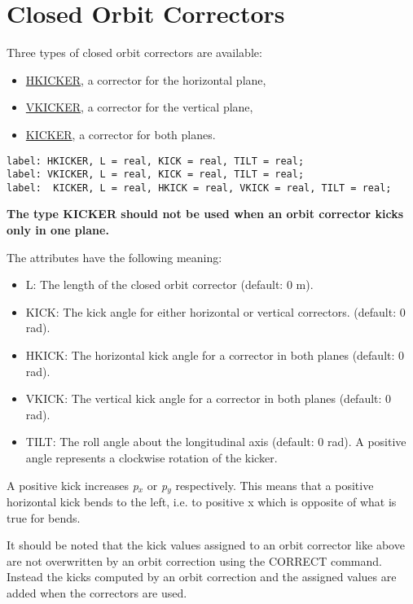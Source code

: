 
\section{Closed Orbit Correctors}
  
Three types of closed orbit correctors are available: 
\begin{itemize}
   \item \href{hkick}{HKICKER}, a corrector for the horizontal plane, 
   \item \href{vkick}{VKICKER}, a corrector for the vertical plane, 
   \item \href{kick}{KICKER}, a corrector for both planes. 
\end{itemize}

\begin{verbatim}
label: HKICKER, L = real, KICK = real, TILT = real;
label: VKICKER, L = real, KICK = real, TILT = real;
label:  KICKER, L = real, HKICK = real, VKICK = real, TILT = real;
\end{verbatim} 

{\bf The type KICKER should not be used when an orbit corrector kicks
  only in one plane.}  

The attributes have the following meaning: 
\begin{itemize}
   \item L: The length of the closed orbit corrector (default: 0 m). 
   \item KICK: The kick angle for either horizontal or vertical correctors. (default: 0 rad). 
   \item HKICK: The horizontal kick angle for a corrector in both planes (default: 0 rad). 
   \item VKICK: The vertical kick angle for a corrector in both planes (default: 0 rad). 
   \item TILT: The roll angle about the longitudinal axis (default: 0
     rad). A positive angle represents a clockwise rotation of the
     kicker.  
\end{itemize} 

A positive kick increases \textit{p$_x$} or \textit{p$_y$}
respectively. This means that a positive horizontal kick bends to the
left,  i.e. to positive x which is opposite of what is true for bends.   

It should be noted that the kick values assigned to an orbit corrector
like above are not overwritten by an orbit correction using the CORRECT
command. Instead the kicks computed by an orbit correction and the
assigned values are added when the correctors are used.  

